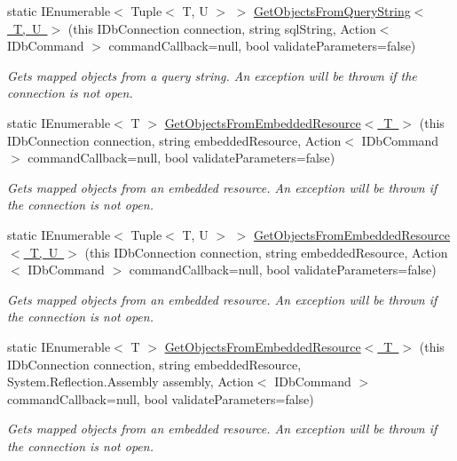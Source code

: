 \begin{DoxyCompactItemize}
static I\+Enumerable$<$ Tuple$<$ T, U $>$ $>$ \mbox{\hyperlink{class_blue_cloud_1_1_extensions_1_1_data_1_1_i_db_connection_extensions_ac8f3f4ea489e102f940854f8ea3a4c55}{Get\+Objects\+From\+Query\+String$<$ T, U $>$}} (this I\+Db\+Connection connection, string sql\+String, Action$<$ I\+Db\+Command $>$ command\+Callback=null, bool validate\+Parameters=false)
\begin{DoxyCompactList}\small\item\em Gets mapped objects from a query string. An exception will be thrown if the connection is not open. \end{DoxyCompactList}\item 
static I\+Enumerable$<$ T $>$ \mbox{\hyperlink{class_blue_cloud_1_1_extensions_1_1_data_1_1_i_db_connection_extensions_ae196dbd8508c49353e1737aa13779e46}{Get\+Objects\+From\+Embedded\+Resource$<$ T $>$}} (this I\+Db\+Connection connection, string embedded\+Resource, Action$<$ I\+Db\+Command $>$ command\+Callback=null, bool validate\+Parameters=false)
\begin{DoxyCompactList}\small\item\em Gets mapped objects from an embedded resource. An exception will be thrown if the connection is not open. \end{DoxyCompactList}\item 
static I\+Enumerable$<$ Tuple$<$ T, U $>$ $>$ \mbox{\hyperlink{class_blue_cloud_1_1_extensions_1_1_data_1_1_i_db_connection_extensions_a28bbe4b7cb773c4b8738bed7826f20d5}{Get\+Objects\+From\+Embedded\+Resource$<$ T, U $>$}} (this I\+Db\+Connection connection, string embedded\+Resource, Action$<$ I\+Db\+Command $>$ command\+Callback=null, bool validate\+Parameters=false)
\begin{DoxyCompactList}\small\item\em Gets mapped objects from an embedded resource. An exception will be thrown if the connection is not open. \end{DoxyCompactList}\item 
static I\+Enumerable$<$ T $>$ \mbox{\hyperlink{class_blue_cloud_1_1_extensions_1_1_data_1_1_i_db_connection_extensions_a5c60246634c1fda423e48c7e6ddbd266}{Get\+Objects\+From\+Embedded\+Resource$<$ T $>$}} (this I\+Db\+Connection connection, string embedded\+Resource, System.\+Reflection.\+Assembly assembly, Action$<$ I\+Db\+Command $>$ command\+Callback=null, bool validate\+Parameters=false)
\begin{DoxyCompactList}\small\item\em Gets mapped objects from an embedded resource. An exception will be thrown if the connection is not open. \end{DoxyCompactList}\item 

\end{DoxyCompactItemize}
